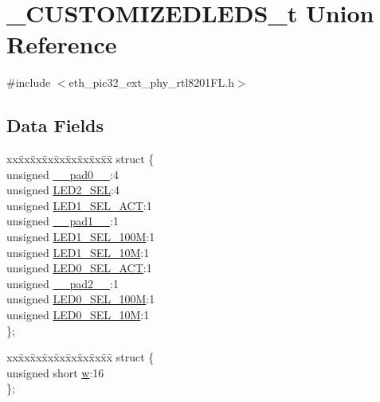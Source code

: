 \hypertarget{union___c_u_s_t_o_m_i_z_e_d_l_e_d_s__t}{}\section{\+\_\+\+C\+U\+S\+T\+O\+M\+I\+Z\+E\+D\+L\+E\+D\+S\+\_\+t Union Reference}
\label{union___c_u_s_t_o_m_i_z_e_d_l_e_d_s__t}


{\ttfamily \#include $<$eth\+\_\+pic32\+\_\+ext\+\_\+phy\+\_\+rtl8201\+F\+L.\+h$>$}

\subsection*{Data Fields}
\begin{DoxyCompactItemize}
\item 
\begin{tabbing}
xx\=xx\=xx\=xx\=xx\=xx\=xx\=xx\=xx\=\kill
struct \{\\
\>unsigned \hyperlink{union___c_u_s_t_o_m_i_z_e_d_l_e_d_s__t_adf71f3d8410c1f1dbbc96680a92c49af}{\_\_pad0\_\_}:4\\
\>unsigned \hyperlink{union___c_u_s_t_o_m_i_z_e_d_l_e_d_s__t_aea12160ede15eefed7a011cb87848ab4}{LED2\_SEL}:4\\
\>unsigned \hyperlink{union___c_u_s_t_o_m_i_z_e_d_l_e_d_s__t_aa3aaec35bef2577be919190bae4b2829}{LED1\_SEL\_ACT}:1\\
\>unsigned \hyperlink{union___c_u_s_t_o_m_i_z_e_d_l_e_d_s__t_acaf2d0924a107ec6e8d2e31febaf66f9}{\_\_pad1\_\_}:1\\
\>unsigned \hyperlink{union___c_u_s_t_o_m_i_z_e_d_l_e_d_s__t_a5159a6163e9890b1223ae7d3d3247289}{LED1\_SEL\_100M}:1\\
\>unsigned \hyperlink{union___c_u_s_t_o_m_i_z_e_d_l_e_d_s__t_ab04197d993940f157706895c26227929}{LED1\_SEL\_10M}:1\\
\>unsigned \hyperlink{union___c_u_s_t_o_m_i_z_e_d_l_e_d_s__t_a815406bc0c2f15c36c7c01b2346941f9}{LED0\_SEL\_ACT}:1\\
\>unsigned \hyperlink{union___c_u_s_t_o_m_i_z_e_d_l_e_d_s__t_a4d97cc5f7d51d22fc2bf3eab35c9cb7f}{\_\_pad2\_\_}:1\\
\>unsigned \hyperlink{union___c_u_s_t_o_m_i_z_e_d_l_e_d_s__t_a068d50e62b048b259ed684ef9b64a224}{LED0\_SEL\_100M}:1\\
\>unsigned \hyperlink{union___c_u_s_t_o_m_i_z_e_d_l_e_d_s__t_a7c9f6fabd898bb6d53ffaa1d451d358f}{LED0\_SEL\_10M}:1\\
\}; \\

\end{tabbing}\item 
\begin{tabbing}
xx\=xx\=xx\=xx\=xx\=xx\=xx\=xx\=xx\=\kill
struct \{\\
\>unsigned short \hyperlink{union___c_u_s_t_o_m_i_z_e_d_l_e_d_s__t_a160850a4684a3e82c2323033964f2e98}{w}:16\\
\}; \\

\end{tabbing}\end{DoxyCompactItemize}


